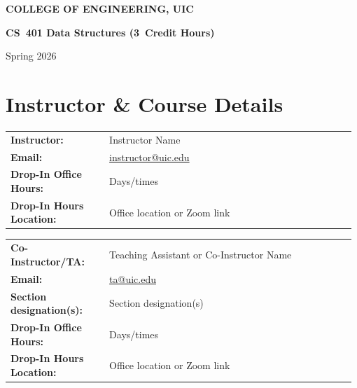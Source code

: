 \documentclass[11pt]{article}
\makeatletter
\newcommand{\collegeName}{COLLEGE OF ENGINEERING, UIC}
\newcommand{\courseRubric}{CS}
\newcommand{\courseNumber}{401}
\newcommand{\courseTitle}{Data Structures}
\newcommand{\creditHours}{3}
\newcommand{\termSemesterYear}{Spring 2026}
\newcommand{\instructorName}{Instructor Name}
\newcommand{\instructorEmail}{instructor@uic.edu}
\newcommand{\officeHours}{Days/times}
\newcommand{\officeHoursLocation}{Office location or Zoom link}
\newcommand{\coInstructorName}{Teaching Assistant or Co-Instructor Name}
\newcommand{\coInstructorEmail}{ta@uic.edu}
\newcommand{\sectionDesignations}{Section designation(s)}
\newcommand{\coOfficeHours}{Days/times}
\newcommand{\coOfficeHoursLocation}{Office location or Zoom link}
\makeatother
\begin{document}
\begin{center}
  {\LARGE\bfseries \collegeName}\par
  \vspace{0.75em}
  {\Large\bfseries
    \courseRubric\ \courseNumber\quad
    \courseTitle\quad
    (\creditHours\ Credit Hours)
  }\par
  \vspace{0.5em}
  {\large \termSemesterYear}\par
\end{center}

\vspace{0.9\baselineskip}

\section*{Instructor \& Course Details}

\noindent
\begin{tabular}{@{}p{0.28\linewidth}p{0.70\linewidth}@{}}
\textbf{Instructor:} & \instructorName \\
\textbf{Email:} & \href{mailto:\instructorEmail}{\instructorEmail} \\
\textbf{Drop-In Office Hours:} & \officeHours \\
\textbf{Drop-In Hours Location:} & \officeHoursLocation \\
\end{tabular}

\vspace{0.6\baselineskip}

\noindent
\begin{tabular}{@{}p{0.28\linewidth}p{0.70\linewidth}@{}}
\textbf{Co-Instructor/TA:} & \coInstructorName \\
\textbf{Email:} & \href{mailto:\coInstructorEmail}{\coInstructorEmail} \\
\textbf{Section designation(s):} & \sectionDesignations \\
\textbf{Drop-In Office Hours:} & \coOfficeHours \\
\textbf{Drop-In Hours Location:} & \coOfficeHoursLocation \\
\end{tabular}

\vspace{0.6\baselineskip}
\end{document}
